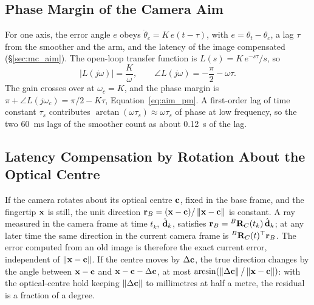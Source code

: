 \subsection{Phase Margin of the Camera Aim}
For one axis, the error angle $e$ obeys $\dot\theta_c=K\,e(t-\tau)$, with $e=\theta_t-\theta_c$,
a lag $\tau$ from the smoother and the arm, and the latency of the image compensated
(\S\ref{sec:mc_aim}). The open-loop transfer function is $L(s)=K\,e^{-s\tau}/s$, so
\begin{equation}
|L(j\omega)|=\frac{K}{\omega},\qquad \angle L(j\omega)=-\frac{\pi}{2}-\omega\tau .
\end{equation}
The gain crosses over at $\omega_c=K$, and the phase margin is
$\pi+\angle L(j\omega_c)=\pi/2-K\tau$, Equation~\ref{eq:aim_pm}. A first-order lag of time constant
$\tau_s$ contributes $\arctan(\omega\tau_s)\approx\omega\tau_s$ of phase at low frequency, so the two
60~ms lags of the smoother count as about 0.12~s of the lag.

\subsection{Latency Compensation by Rotation About the Optical Centre}
If the camera rotates about its optical centre $\mathbf{c}$, fixed in the base frame, and the fingertip
$\mathbf{x}$ is still, the unit direction $\mathbf{r}_B=(\mathbf{x}-\mathbf{c})/\left\lVert\mathbf{x}-\mathbf{c}\right\rVert$ is
constant. A ray measured in the camera frame at time $t_k$, $\hat{\mathbf{d}}_k$, satisfies
$\mathbf{r}_B={}^{B}\mathbf{R}_{C}(t_k)\,\hat{\mathbf{d}}_k$; at any later time the same direction in the current
camera frame is ${}^{B}\mathbf{R}_{C}(t)^{\top}\mathbf{r}_B$. The error computed from an old image is therefore the
exact current error, independent of $\left\lVert\mathbf{x}-\mathbf{c}\right\rVert$. If the centre moves by
$\Delta\mathbf{c}$, the true direction changes by the angle between $\mathbf{x}-\mathbf{c}$ and
$\mathbf{x}-\mathbf{c}-\Delta\mathbf{c}$, at most $\arcsin(\left\lVert\Delta\mathbf{c}\right\rVert/\left\lVert\mathbf{x}-\mathbf{c}\right\rVert)$:
with the optical-centre hold keeping $\left\lVert\Delta\mathbf{c}\right\rVert$ to millimetres at half a metre, the
residual is a fraction of a degree.

